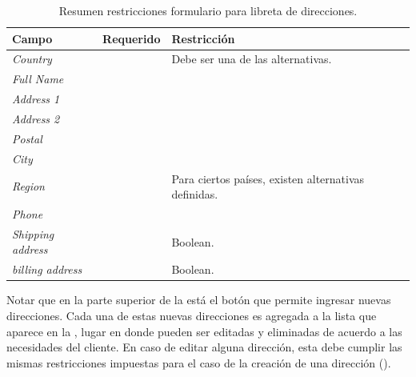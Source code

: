 		\begin{table}[H]
		    \centering
			\begin{tabular}{ |l|c||l| }
				\hline Campo & Requerido & Restricción \\ \hline
				\multirow{1}{*}{\textit{Country}} 			&  \checkmark 	&  Debe ser una de las alternativas.\\ \hline
				\multirow{1}{*}{\textit{Full Name}} 		&  \checkmark	& \\ \hline
				\multirow{1}{*}{\textit{Address 1}} 		&  \checkmark	& \\ \hline
				\multirow{1}{*}{\textit{Address 2}} 		&  				& \\ \hline
				\multirow{1}{*}{\textit{Postal}} 			&  \checkmark	& \\ \hline
				\multirow{1}{*}{\textit{City}} 				&  \checkmark	& \\ \hline
				\multirow{1}{*}{\textit{Region}} 			&  \checkmark	& Para ciertos países, existen alternativas definidas.\\ \hline
				\multirow{1}{*}{\textit{Phone}} 			&  \checkmark	& \\ \hline
				\multirow{1}{*}{\textit{Shipping address}} 	&  \checkmark	& Boolean. \\ \hline
				\multirow{1}{*}{\textit{billing address}} 	&  \checkmark	& Boolean. \\ \hline
			\end{tabular}
		 	\caption{Resumen restricciones formulario para libreta de direcciones.}
		    \label{tab:profile:form:restrictions:address}
		\end{table}

		Notar que en la parte superior de la  está el botón que permite ingresar nuevas direcciones. Cada una de estas nuevas direcciones es agregada a la lista que aparece en la , lugar en donde pueden ser editadas y eliminadas de acuerdo a las necesidades del cliente. En caso de editar alguna dirección, esta debe cumplir las mismas restricciones impuestas para el caso de la creación de una dirección ().

